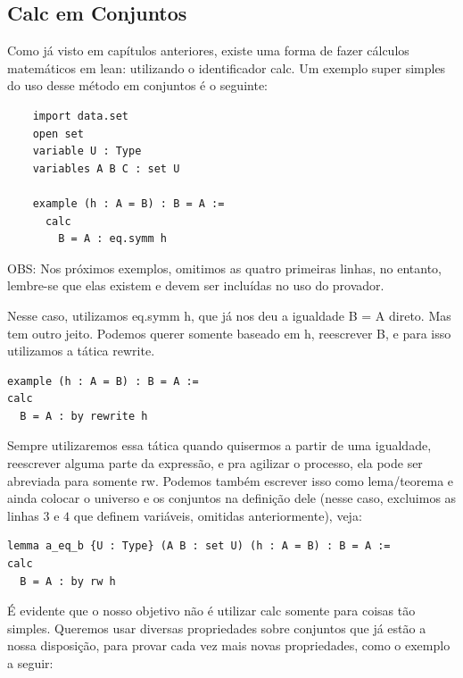 \subsection{Calc em Conjuntos}

Como já visto em capítulos anteriores, existe uma forma de fazer cálculos matemáticos em lean: utilizando o identificador {\selectfont calc}. Um exemplo super simples do uso desse método em conjuntos é o seguinte:

\begin{lstlisting}
    import data.set
    open set
    variable U : Type
    variables A B C : set U

    example (h : A = B) : B = A :=
      calc
        B = A : eq.symm h
\end{lstlisting}

OBS: Nos próximos exemplos, omitimos as quatro primeiras linhas, no entanto, lembre-se que elas existem e devem ser incluídas no uso do provador.

Nesse caso, utilizamos {\selectfont eq.symm h}, que já nos deu a igualdade {\selectfont B = A} direto. Mas tem outro jeito. Podemos querer somente baseado em {\selectfont h}, reescrever {\selectfont B}, e para isso utilizamos a tática {\selectfont rewrite}.

\begin{lstlisting}
example (h : A = B) : B = A :=
calc
  B = A : by rewrite h \end{lstlisting}

Sempre utilizaremos essa tática quando quisermos a partir de uma igualdade, reescrever alguma parte da expressão, e pra agilizar o processo, ela pode ser abreviada para somente {\selectfont rw}.
Podemos também escrever isso como lema/teorema e ainda colocar o universo e os conjuntos na definição dele (nesse caso, excluimos as linhas $3$ e $4$ que definem variáveis, omitidas anteriormente), veja:

\begin{lstlisting}
lemma a_eq_b {U : Type} (A B : set U) (h : A = B) : B = A :=
calc
  B = A : by rw h \end{lstlisting}

É evidente que o nosso objetivo não é utilizar {\selectfont calc} somente para coisas tão simples. Queremos usar diversas propriedades sobre conjuntos que já estão a nossa disposição, para provar cada vez mais novas propriedades, como o exemplo a seguir:

